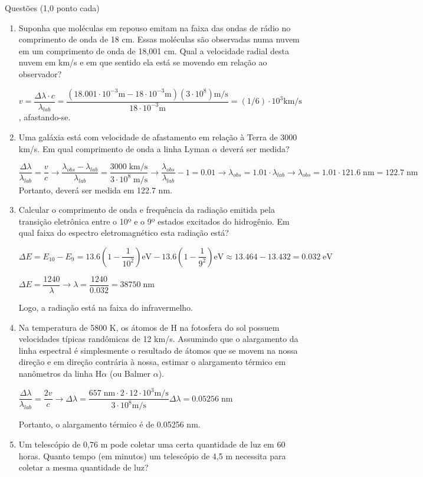 \documentclass{article}
\begin{document}
Questões (1,0 ponto cada)

\begin{enumerate}
\item Suponha que moléculas em repouso emitam na faixa das ondas de rádio no comprimento de onda de 18 cm. Essas moléculas são observadas numa nuvem em um comprimento de onda de 18,001 cm. Qual a velocidade radial desta nuvem em km/s e em que sentido ela está se movendo em relação ao observador?

$v = \dfrac{\Delta \lambda \cdot c}{\lambda_{lab}} = \dfrac{(18.001 \cdot 10^{-3}\mbox{m} - 18 \cdot 10^{-3}\mbox{m}) (3 \cdot 10^8)\mbox{m/s}}{18 \cdot 10^{-3}\mbox{m}} = (1/6) \cdot 10^3\mbox{km/s}$, afastando-se.

\item Uma galáxia está com velocidade de afastamento em relação à Terra de 3000 km/s. Em qual comprimento de onda a linha Lyman $\alpha$ deverá ser medida?

$\dfrac{\Delta \lambda}{\lambda_{lab}} = \dfrac{v}{c} \rightarrow
  \dfrac{\lambda_{obs} - \lambda_{lab}}{\lambda_{lab}} = \dfrac{3000\;\mbox{km/s}}{3 \cdot 10^8\;\mbox{m/s}} \rightarrow
  \dfrac{\lambda_{obs}}{\lambda_{lab}} - 1 = 0.01 \rightarrow
  \lambda_{obs} = 1.01 \cdot \lambda_{lab} \rightarrow
  \lambda_{obs} = 1.01 \cdot 121.6\;\mbox{nm} = 122.7\;\mbox{nm}
$
Portanto, deverá ser medida em 122.7 nm.

\item Calcular o comprimento de onda e frequência da radiação emitida pela transição eletrônica entre o 10º e o 9º estados excitados do hidrogênio. Em qual faixa do espectro eletromagnético esta radiação está?

$\Delta E = E_{10} - E_9 = 13.6 (1 - \dfrac{1}{10^2})\mbox{eV} - 13.6 (1 - \dfrac{1}{9^2})\mbox{eV} \approx 13.464 - 13.432 = 0.032\;\mbox{eV}$

$\Delta E = \dfrac{1240}{\lambda} \rightarrow \lambda = \dfrac{1240}{0.032} = 38750\;\mbox{nm}$

Logo, a radiação está na faixa do infravermelho.

\item Na temperatura de 5800 K, os átomos de H na fotosfera do sol possuem velocidades típicas randômicas de 12 km/s. Assumindo que o alargamento da linha espectral é simplesmente o resultado de átomos que se movem na nossa direção e em direção contrária à nossa, estimar o alargamento térmico em nanômetros da linha H$\alpha$ (ou Balmer $\alpha$). 

$\dfrac{\Delta \lambda}{\lambda_{lab}} = \dfrac{2v}{c} \rightarrow
\Delta \lambda = \dfrac{657\;\mbox{nm} \cdot 2 \cdot 12 \cdot 10^3\mbox{m/s}}{3 \cdot 10^8\mbox{m/s}}
\Delta \lambda = 0.05256\;\mbox{nm}
$

Portanto, o alargamento térmico é de 0.05256 nm.

\item Um telescópio de 0,76 m pode coletar uma certa quantidade de luz em 60 horas. Quanto tempo (em minutos) um telescópio de 4,5 m necessita para coletar a mesma quantidade de luz? 



\end{enumerate}
\end{document}
